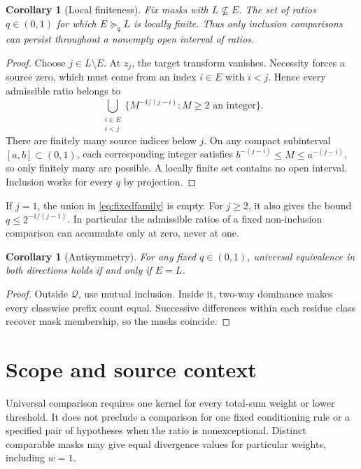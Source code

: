 \documentclass[11pt,a4paper]{article}
\newtheorem{corollary}[theorem]{Corollary}\newtheorem{proposition}[theorem]{Proposition}
\theoremstyle{remark}\newtheorem*{ednote}{Editorial note (ProveIt, 2026-10-01)}
\begin{document}
\begin{corollary}[Local finiteness]\label{cor:local}
Fix masks with $L\not\subseteq E$. The set of ratios $q\in(0,1)$ for which $E\succeq_q L$ is locally finite. Thus only inclusion comparisons can persist throughout a nonempty open interval of ratios.
\end{corollary}
\begin{proof}
Choose $j\in L\setminus E$. At $z_j$, the target transform vanishes. Necessity forces a source zero, which must come from an index $i\in E$ with $i<j$. Hence every admissible ratio belongs to
\begin{equation}\label{eq:fixedfamily}
 \bigcup_{\substack{i\in E\\i<j}}
 \{M^{-1/(j-i)}:M\ge2\text{ an integer}\}.
\end{equation}
There are finitely many source indices below $j$. On any compact subinterval $[a,b]\subset(0,1)$, each corresponding integer satisfies $b^{-(j-i)}\le M\le a^{-(j-i)}$, so only finitely many are possible. A locally finite set contains no open interval. Inclusion works for every $q$ by projection.
\end{proof}

If $j=1$, the union in \eqref{eq:fixedfamily} is empty. For $j\ge2$, it also gives the bound $q\le2^{-1/(j-1)}$. In particular the admissible ratios of a fixed non-inclusion comparison can accumulate only at zero, never at one.

\begin{corollary}[Antisymmetry]
For any fixed $q\in(0,1)$, universal equivalence in both directions holds if and only if $E=L$.
\end{corollary}
\begin{proof}
Outside $\mathcal Q$, use mutual inclusion. Inside it, two-way dominance makes every classwise prefix count equal. Successive differences within each residue class recover mask membership, so the masks coincide.
\end{proof}

\section{Scope and source context}
Universal comparison requires one kernel for every total-sum weight or lower threshold. It does not preclude a comparison for one fixed conditioning rule or a specified pair of hypotheses when the ratio is nonexceptional. Distinct comparable masks may give equal divergence values for particular weights, including $w=1$.
\end{document}
